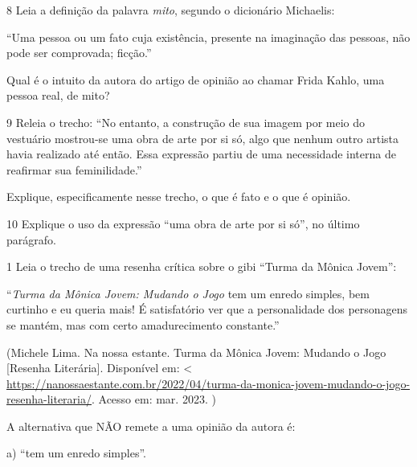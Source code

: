 {\num{8} Leia a definição da palavra \emph{mito}, segundo o dicionário
Michaelis:

``Uma pessoa ou um fato cuja existência, presente na imaginação das
pessoas, não pode ser comprovada; ficção.''

Qual é o intuito da autora do artigo de opinião ao chamar Frida Kahlo,
uma pessoa real, de mito?



\num{9} Releia o trecho: ``No entanto, a construção de sua imagem por
meio do vestuário mostrou-se uma obra de arte por si só, algo que nenhum
outro artista havia realizado até então. Essa expressão partiu de uma
necessidade interna de reafirmar sua feminilidade.''

Explique, especificamente nesse trecho, o que é fato e o que é opinião.



\num{10} Explique o uso da expressão ``uma obra de arte por si só'', no
último parágrafo.




\num{1} Leia o trecho de uma resenha crítica sobre o gibi ``Turma da
Mônica Jovem'':

``\emph{Turma da Mônica Jovem: Mudando o Jogo} tem um enredo simples,
bem curtinho e eu queria mais! É satisfatório ver que a personalidade
dos personagens se mantém, mas com certo amadurecimento constante.''

(Michele Lima. Na nossa estante. Turma da Mônica Jovem: Mudando o Jogo
{[}Resenha Literária{]}. Disponível em: \textless{}
\url{https://nanossaestante.com.br/2022/04/turma-da-monica-jovem-mudando-o-jogo-resenha-literaria/}.
Acesso em: mar. 2023. )

A alternativa que NÃO remete a uma opinião da autora é:

a) ``tem um enredo simples''.

}
